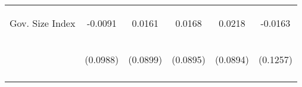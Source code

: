\begin{center}
\begin{tabular}{lccccc}
\noalign{\smallskip}Gov. Size Index & \begin{scriptsize}-0.0091\end{scriptsize} & \begin{scriptsize}0.0161\end{scriptsize} & \begin{scriptsize}0.0168\end{scriptsize} & \begin{scriptsize}0.0218\end{scriptsize} & \begin{scriptsize}-0.0163\end{scriptsize}\\
 & \begin{scriptsize}(0.0988)\end{scriptsize} & \begin{scriptsize}(0.0899)\end{scriptsize} & \begin{scriptsize}(0.0895)\end{scriptsize} & \begin{scriptsize}(0.0894)\end{scriptsize} & \begin{scriptsize}(0.1257)\end{scriptsize}\\
\noalign{\smallskip}\hline\end{tabular}\\
\end{center}
